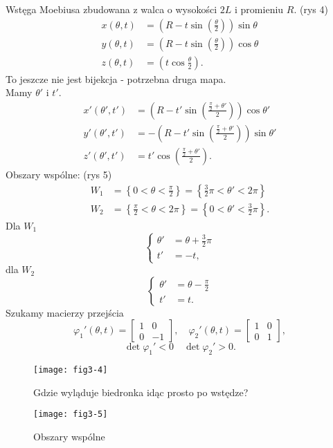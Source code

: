 \documentclass[../main.tex]{subfiles}
\begin{document}
\begin{przyklad}
    Wstęga Moebiusa zbudowana z walca o wysokości $2L$ i promieniu $R$.
    (rys 4)\\
    \begin{align*}
        x(\theta, t) &= \left( R - t\sin\left(\frac{\theta}{2}\right)\right)\sin\theta\\
        y(\theta, t) &= \left( R - t\sin\left(\frac{\theta}{2}\right)\right)\cos\theta\\
        z(\theta, t) &= \left( t\cos\frac{\theta}{2}\right)
    .\end{align*}
    To jeszcze nie jest bijekcja - potrzebna druga mapa.\\
    Mamy $\theta'$ i $t'$.
    \begin{align*}
        x'(\theta',t') &= \left(R - t'\sin\left(\frac{\frac{\pi}{2} + \theta'}{2}\right)\right)\cos\theta'\\
        y'(\theta',t') &= -\left(R - t'\sin\left(\frac{\frac{\pi}{2} + \theta'}{2}\right)\right)\sin\theta'\\
        z'(\theta',t') &= t' \cos\left(\frac{\frac{\pi}{2} + \theta'}{2}\right)
    .\end{align*}
    Obszary wspólne: (rys 5)
    \begin{align*}
        W_1 &= \left\{ 0<\theta<\frac{\pi}{2} \right\} = \left\{ \frac{3}{2}\pi < \theta' < 2\pi \right\}\\
        W_2 &= \left\{ \frac{\pi}{2} < \theta < 2\pi \right\} = \left\{ 0 < \theta' < \frac{3}{2}\pi \right\}
    .\end{align*}
    Dla $W_1$
    \[
        \begin{cases}
            \theta' &= \theta + \frac{3}{2}\pi\\
            t' &= -t
        ,\end{cases}
    \]
dla $W_2$
    \[
        \begin{cases}
            \theta' &= \theta - \frac{\pi}{2}\\
            t' &= t
        .\end{cases}
    \]
    Szukamy macierzy przejścia
    \[
        \varphi_1'(\theta, t) = \begin{bmatrix} 1&0\\0&-1 \end{bmatrix},\quad \varphi_2'(\theta,t) = \begin{bmatrix} 1&0\\0&1 \end{bmatrix}
    ,\]
\[
\det \varphi_1' < 0 \quad \det \varphi_2' > 0
.\]
\end{przyklad}
\begin{figure}[h]
    \centering
    \texttt{[image: fig3-4]}
    \caption{Gdzie wyląduje biedronka idąc prosto po wstędze?}
    \label{fig:fig3-4}
\end{figure}
\begin{figure}[h]
    \centering
    \texttt{[image: fig3-5]}
    \caption{Obszary wspólne}
    \label{fig:fig3-5}
\end{figure}
\end{document}
